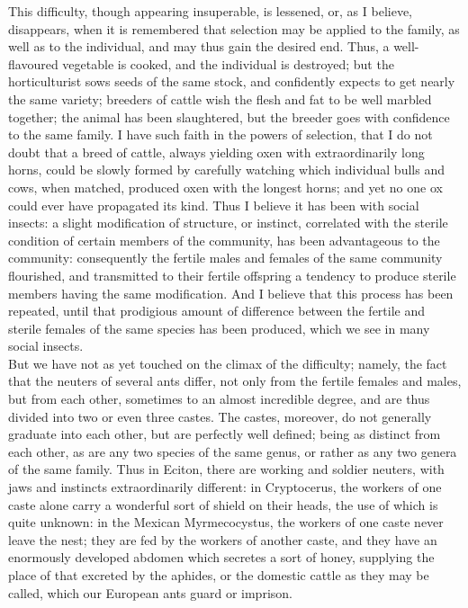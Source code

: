 \indent This difficulty, though appearing insuperable, is lessened, or, as I believe, disappears, when it is remembered that selection may be applied to the family, as well as to the individual, and may thus gain the desired end. Thus, a well-flavoured vegetable is cooked, and the individual is destroyed; but the horticulturist sows seeds of the same stock, and confidently expects to get nearly the same variety; breeders of cattle wish the flesh and fat to be well marbled together; the animal has been slaughtered, but the breeder goes with confidence to the same family. I have such faith in the powers of selection, that I do not doubt that a breed of cattle, always yielding oxen with extraordinarily long horns, could be slowly formed by carefully watching which individual bulls and cows, when matched, produced oxen with the longest horns; and yet no one ox could ever have propagated its kind. Thus I believe it has been with social insects: a slight modification of structure, or instinct, correlated with the sterile condition of certain members of the community, has been advantageous to the community: consequently the fertile males and females of the same community flourished, and transmitted to their fertile offspring a tendency to produce sterile members having the same modification. And I believe that this process has been repeated, until that prodigious amount of difference between the fertile and sterile females of the same species has been produced, which we see in many social insects.\\
\indent But we have not as yet touched on the climax of the difficulty; namely, the fact that the neuters of several ants differ, not only from the fertile females and males, but from each other, sometimes to an almost incredible degree, and are thus divided into two or even three castes.  The castes, moreover, do not generally graduate into each other, but are perfectly well defined; being as distinct from each other, as are any two species of the same genus, or rather as any two genera of the same family. Thus in Eciton, there are working and soldier neuters, with jaws and instincts extraordinarily different: in Cryptocerus, the workers of one caste alone carry a wonderful sort of shield on their heads, the use of which is quite unknown: in the Mexican Myrmecocystus, the workers of one caste never leave the nest; they are fed by the workers of another caste, and they have an enormously developed abdomen which secretes a sort of honey, supplying the place of that excreted by the aphides, or the domestic cattle as they may be called, which our European ants guard or imprison.\\
